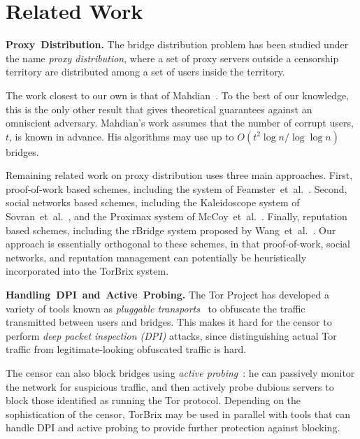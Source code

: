 \documentclass{llncs}
\newcommand{\etal}{et~al.}
\newcommand{\sfsize}{\fontsize{0.73\baselineskip}{0.73\baselineskip}\selectfont}
\newcommand{\sans}[1]{\textsf{\sfsize \mbox{#1}}}
\newcommand{\sansb}[1]{\textbf{\sans{\mbox{#1}}}}
\newcommand{\para}[1]{\vspace{0.55em} \noindent \sansb{{\mbox{#1}}}}
\newcommand{\brix}{\sans{TorBrix}\xspace}
\begin{document}
\section{Related Work} \label{sec:relatedwork}

\para{Proxy Distribution.} The bridge distribution problem has been studied under the name \emph{proxy distribution}, where a set of proxy servers outside a censorship territory are distributed among a set of users inside the territory. %

The work closest to our own is that of Mahdian~\cite{Mahdian:2010}.  To the best of our knowledge, this is the only other result that gives theoretical guarantees against an omniscient adversary.  Mahdian's work assumes that the number of corrupt users, $t$, is known in advance. His algorithms may use up to ${O(t^2 \log{n} / \log{\log{n}})}$ bridges.

Remaining related work on proxy distribution uses three main approaches.  First, proof-of-work based schemes, including the system of Feamster~\etal~\cite{Feamster:PETS:2003}.  Second, social networks based schemes, including the Kaleidoscope system of Sovran~\etal~\cite{Sovran:2008:PSN}, and the Proximax system of McCoy~\etal~\cite{McCoy:FC:2011}.  Finally, reputation based schemes, including the rBridge system proposed by Wang~\etal~\cite{WangLBH:rBridge:13}.  Our approach is essentially orthogonal to these schemes, in that proof-of-work, social networks, and reputation management can potentially be heuristically incorporated into the \brix system.

\para{Handling DPI and Active Probing.} The Tor Project has developed a variety of tools known as \emph{pluggable transports}~\cite{Tor:PluggableTransport} to obfuscate the traffic transmitted between users and bridges. This makes it hard for the censor to perform \emph{deep packet inspection (DPI)} attacks, since distinguishing actual Tor traffic from legitimate-looking obfuscated traffic is hard.

The censor can also block bridges using \emph{active probing}~\cite{Ensafi2015b}: he can passively monitor the network for suspicious traffic, and then actively probe dubious servers to block those identified as running the Tor protocol.
Depending on the sophistication of the censor, \brix may be used in parallel with tools that can handle DPI and active probing to provide further protection against blocking.
\end{document}
